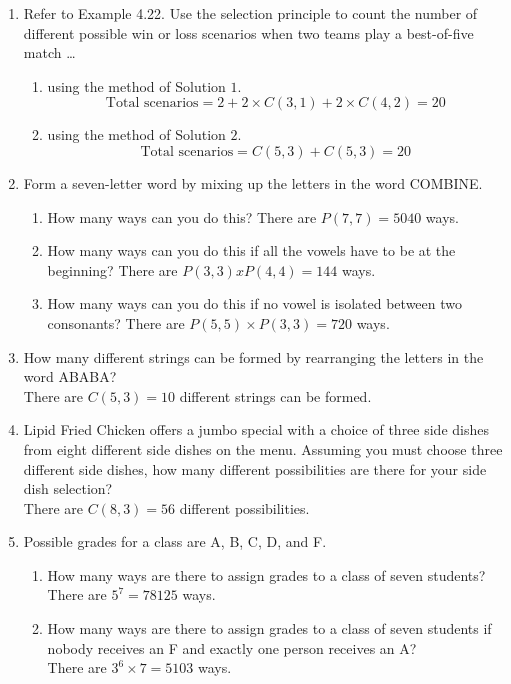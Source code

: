 \documentclass[10pt]{article}
\begin{document}
\begin{enumerate}
  \item Refer to Example 4.22. Use the selection principle to count the number of different possible win or loss scenarios when two teams play a best-of-five match …
  \begin{enumerate}
    \item using the method of Solution $1$.
    \[\text{Total scenarios} = 2 + 2 \times C(3,1) + 2 \times C(4,2) = 20\]
    \item using the method of Solution $2$.
    \[\text{Total scenarios} = C(5,3) + C(5,3) = 20\]
  \end{enumerate}

  \item Form a seven-letter word by mixing up the letters in the word COMBINE.
  \begin{enumerate}
    \item How many ways can you do this?
    There are $P(7,7) = 5040$ ways.
    \item How many ways can you do this if all the vowels have to be at the beginning?
    There are $P(3,3) x P(4,4) = 144$ ways.  
    \item How many ways can you do this if no vowel is isolated between two consonants?
    There are $P(5,5) \times P(3,3) = 720$ ways.  
  \end{enumerate}

  \item How many different strings can be formed by rearranging the letters in the word ABABA?\\
  There are $C(5,3) = 10$ different strings can be formed.  
  
  \item Lipid Fried Chicken offers a jumbo special with a choice of three side dishes from eight different side dishes on the menu. Assuming you must choose three different side dishes, how many different possibilities are there for your side dish selection?\\
  There are $C(8,3) = 56$ different possibilities.

  \item Possible grades for a class are A, B, C, D, and F. 
  \begin{enumerate}
    \item How many ways are there to assign grades to a class of seven students?\\
    There are $5^7 = 78125$ ways.
    \item How many ways are there to assign grades to a class of seven students if nobody receives an F and exactly one person receives an A?\\
    There are $3^6 \times 7 = 5103$ ways.
  \end{enumerate}


\end{enumerate}
\end{document}
